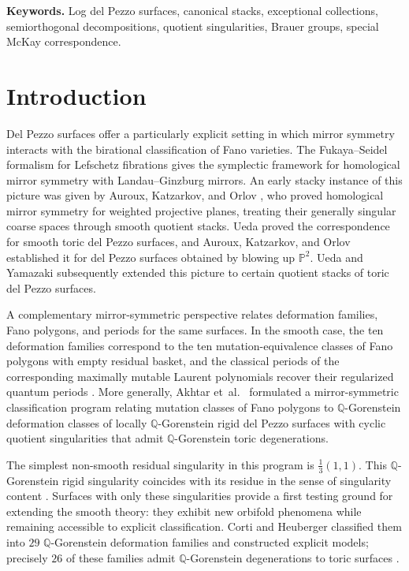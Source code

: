 \documentclass[11pt]{article}
\theoremstyle{plain}
\theoremstyle{definition}
\theoremstyle{remark}
\begin{document}
\smallskip
\noindent\textbf{Keywords.}
Log del Pezzo surfaces, canonical stacks, exceptional collections, semiorthogonal decompositions, quotient singularities, Brauer groups, special McKay correspondence.

\section{Introduction}

Del Pezzo surfaces offer a particularly explicit setting in which mirror
symmetry interacts with the birational classification of Fano varieties.
The Fukaya--Seidel formalism for Lefschetz fibrations \cite{Seidel2008}
gives the symplectic framework for homological mirror symmetry with
Landau--Ginzburg mirrors. An early stacky instance of this picture was
given by Auroux, Katzarkov, and Orlov
\cite{AurouxKatzarkovOrlov2008}, who proved homological mirror symmetry
for weighted projective planes, treating their generally singular coarse
spaces through smooth quotient stacks. Ueda \cite{Ueda2006} proved the
correspondence for smooth toric del Pezzo surfaces, and Auroux,
Katzarkov, and Orlov \cite{AurouxKatzarkovOrlov2006} established it for
del Pezzo surfaces obtained by blowing up $\mathbb P^2$. Ueda and Yamazaki
\cite{UedaYamazaki2013} subsequently extended this picture to certain
quotient stacks of toric del Pezzo surfaces.

A complementary mirror-symmetric perspective
relates deformation families, Fano polygons, and periods for the same
surfaces. In the smooth case, the ten deformation families correspond to the ten
mutation-equivalence classes of Fano polygons with empty residual basket,
and the classical periods of the corresponding maximally mutable Laurent
polynomials recover their regularized quantum periods
\cite{AkhtarEtAl2016,KasprzykNillPrince2017}. More generally, Akhtar
et~al.\ \cite{AkhtarEtAl2016} formulated a mirror-symmetric classification
program relating mutation classes of Fano polygons to
$\mathbb Q$-Gorenstein deformation classes of locally
$\mathbb Q$-Gorenstein rigid del Pezzo surfaces with cyclic quotient
singularities that admit $\mathbb Q$-Gorenstein toric degenerations.

The simplest non-smooth residual singularity in this program is
$\tfrac13(1,1)$. This $\mathbb Q$-Gorenstein rigid singularity coincides
with its residue in the sense of singularity content \cite{AkhtarEtAl2016,AkhtarKasprzyk2014}.
Surfaces with only these singularities provide a first testing
ground for extending the smooth theory: they exhibit new orbifold
phenomena while remaining accessible to explicit classification.
Corti and Heuberger classified them into $29$ $\mathbb Q$-Gorenstein
deformation families and constructed explicit models; precisely $26$
of these families admit $\mathbb Q$-Gorenstein degenerations to toric
surfaces \cite{Corti2016}.
\end{document}
